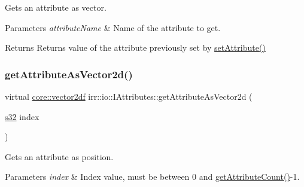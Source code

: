 Gets an attribute as vector. 


\begin{DoxyParams}{Parameters}
{\em attribute\+Name} & Name of the attribute to get. \\
\hline
\end{DoxyParams}
\begin{DoxyReturn}{Returns}
Returns value of the attribute previously set by \hyperlink{classirr_1_1io_1_1IAttributes_a03fa31acb481ae23678676cc183f09a6}{set\+Attribute()} 
\end{DoxyReturn}
\mbox{\label{classirr_1_1io_1_1IAttributes_a81fb2a12345e49b12cd6cf05968544f5}} 
\subsubsection{\texorpdfstring{get\+Attribute\+As\+Vector2d()}{getAttributeAsVector2d()}\hspace{0.1cm}{\footnotesize\ttfamily [3/4]}}
{\footnotesize\ttfamily virtual \hyperlink{namespaceirr_1_1core_a116f90bd31515724b6235014ee2b74d5}{core\+::vector2df} irr\+::io\+::\+I\+Attributes\+::get\+Attribute\+As\+Vector2d (\begin{DoxyParamCaption}\item[{\hyperlink{namespaceirr_ac66849b7a6ed16e30ebede579f9b47c6}{s32}}]{index }\end{DoxyParamCaption})\hspace{0.3cm}{\ttfamily [pure virtual]}}



Gets an attribute as position. 


\begin{DoxyParams}{Parameters}
{\em index} & Index value, must be between 0 and \hyperlink{classirr_1_1io_1_1IAttributes_a796bdd9440ee7ba0b6742a90a82870b6}{get\+Attribute\+Count()}-\/1. \\
\hline
\end{DoxyParams}
\mbox{\label{classirr_1_1io_1_1IAttributes_a81fb2a12345e49b12cd6cf05968544f5}} 
